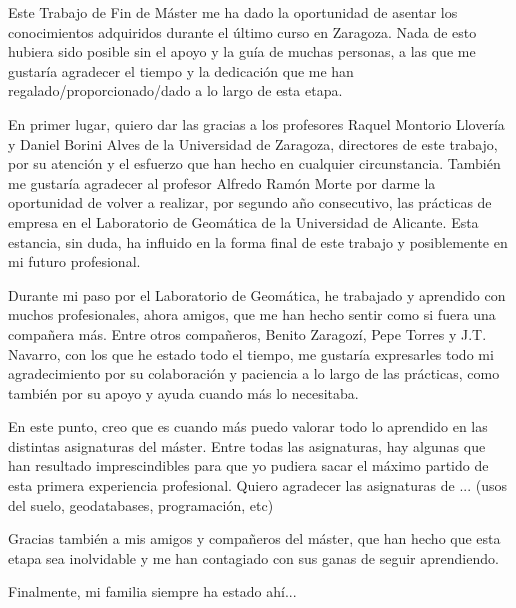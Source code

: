 
\begin{acknowledgements}      

Este Trabajo de Fin de Máster me ha dado la oportunidad de asentar los conocimientos adquiridos durante el último curso en Zaragoza. Nada de esto hubiera sido posible sin el apoyo y la guía de muchas personas, a las que me gustaría agradecer el tiempo y la dedicación que me han regalado/proporcionado/dado a lo largo de esta etapa.

En primer lugar, quiero dar las gracias a los profesores Raquel Montorio Llovería y Daniel Borini Alves de la Universidad de Zaragoza, directores de este trabajo, por su atención y el esfuerzo que han hecho en cualquier circunstancia. También me gustaría agradecer al profesor Alfredo Ramón Morte por darme la oportunidad de volver a realizar, por segundo año consecutivo, las prácticas de empresa en el Laboratorio de Geomática de la Universidad de Alicante. Esta estancia, sin duda, ha influido en la forma final de este trabajo y posiblemente en mi futuro profesional.

Durante mi paso por el Laboratorio de Geomática, he trabajado y aprendido con muchos profesionales, ahora amigos, que me han hecho sentir como si fuera una compañera más. Entre otros compañeros, Benito Zaragozí, Pepe Torres y J.T. Navarro, con los que he estado todo el tiempo, me gustaría expresarles todo mi agradecimiento por su colaboración y paciencia a lo largo de las prácticas, como también por su apoyo y ayuda cuando más lo necesitaba.

En este punto, creo que es cuando más puedo valorar todo lo aprendido en las distintas asignaturas del máster. Entre todas las asignaturas, hay algunas que han resultado imprescindibles para que yo pudiera sacar el máximo partido de esta primera experiencia profesional. Quiero agradecer  las asignaturas de ... (usos del suelo, geodatabases, programación, etc)

Gracias también a mis amigos y compañeros del máster, que han hecho que esta etapa sea inolvidable y me han contagiado con sus ganas de seguir aprendiendo.

Finalmente, mi familia siempre ha estado ahí... 

\end{acknowledgements}
